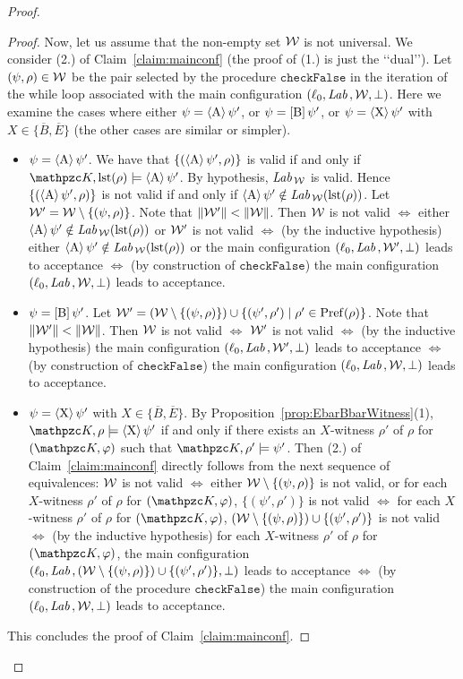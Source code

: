 \begin{proof}
\begin{proof}
Now, let us assume that the non-empty set  ${\mathcal{W}}$ is not universal.
We consider (2.) of Claim~\ref{claim:mainconf} (the proof of (1.) is just the \lq\lq dual\rq\rq).
 Let $(\psi,\rho)\in {\mathcal{W}}$ be the pair selected by the procedure $\texttt{checkFalse}$   in the iteration of the while loop   associated with the main configuration $(\ell_0,\textit{Lab}\,, {\mathcal{W}}, \operatorname{\bot})$. Here we examine the cases where either $\psi=\operatorname{\langle A\rangle}\psi'$, or $\psi=\operatorname{\mathopen[ B \mathclose]}\psi'$, or $\psi=\operatorname{\langle X\rangle}\psi'$  with $X\in \{\overline{B},\overline{E}\}$ (the other cases are similar or simpler).
\begin{itemize}
  \item $\psi=\operatorname{\langle A\rangle}\psi'$. We have that $\{(\operatorname{\langle A\rangle}\psi',\rho)\}$ is  valid if and only if $\Ku,\lst(\rho)\models \hsA\psi'$. By hypothesis, $\textit{Lab}\,_{\mathcal{W}}$ is valid.
  Hence $\{(\operatorname{\langle A\rangle}\psi',\rho)\}$ is not valid if and only if $\operatorname{\langle A\rangle}\psi'\notin \textit{Lab}\,_{\mathcal{W}}(\operatorname{lst}(\rho))$.
   Let ${\mathcal{W}}' = {\mathcal{W}}\setminus \{(\psi,\rho)\}$. Note that
      $\|{{\mathcal{W}}'}\|< \|{{\mathcal{W}}}\|$.
    Then
   ${\mathcal{W}}$ is not valid $\Longleftrightarrow$  either $\operatorname{\langle A\rangle}\psi'\notin \textit{Lab}\,_{\mathcal{W}}(\operatorname{lst}(\rho))$ or ${\mathcal{W}}'$ is not valid $\Longleftrightarrow$ (by the inductive hypothesis) either $\operatorname{\langle A\rangle}\psi'\notin \textit{Lab}\,_{\mathcal{W}}(\operatorname{lst}(\rho))$ or the main configuration $(\ell_0,\textit{Lab}\,,{\mathcal{W}}',\operatorname{\bot})$ leads to acceptance $\Longleftrightarrow$ (by construction of $\texttt{checkFalse}$) the main configuration $(\ell_0,\textit{Lab}\,,{\mathcal{W}},\operatorname{\bot})$ leads to acceptance.
  \item $\psi=\operatorname{\mathopen[ B \mathclose]}\psi'$.  Let ${\mathcal{W}}' = ({\mathcal{W}}\setminus \{(\psi,\rho)\})\cup \{(\psi',\rho')\mid \rho'\in\operatorname{Pref}(\rho)\}$. Note that
      $\|{{\mathcal{W}}'}\|< \|{{\mathcal{W}}}\|$.
Then ${\mathcal{W}}$ is not valid $\Longleftrightarrow$  ${\mathcal{W}}'$ is not valid    $\Longleftrightarrow$ (by the inductive hypothesis) the main configuration $(\ell_0,\textit{Lab}\,,{\mathcal{W}}',\operatorname{\bot})$ leads to acceptance $\Longleftrightarrow$ (by construction of $\texttt{checkFalse}$) the main configuration $(\ell_0,\textit{Lab}\,,{\mathcal{W}},\operatorname{\bot})$ leads to acceptance.
 \item $\psi=\operatorname{\langle X\rangle}\psi'$  with $X\in \{\overline{B},\overline{E}\}$. By Proposition~\ref{prop:EbarBbarWitness}(1), $\Ku,\rho\models \hsX\psi'$ if and only if there exists an $X$-witness $\rho'$ of $\rho$
  for $(\Ku,\varphi)$  such that $\Ku,\rho'\models \psi'$.     Then (2.) of Claim~\ref{claim:mainconf} directly follows from the next sequence of equivalences: ${\mathcal{W}}$ is not valid $\Longleftrightarrow$  either ${\mathcal{W}}\setminus \{(\psi,\rho)\}$ is not valid, or  for each
  $X$-witness $\rho'$ of $\rho$
  for $(\Ku,\varphi)$,  $\{(\psi',\rho')\}$ is not valid  $\Longleftrightarrow$ for each
  $X$-witness $\rho'$ of $\rho$
  for $(\Ku,\varphi)$,   $({\mathcal{W}}\setminus \{(\psi,\rho)\})\cup \{(\psi',\rho')\}$ is not valid $\Longleftrightarrow$ (by the inductive hypothesis)  for each
  $X$-witness $\rho'$ of $\rho$
  for $(\Ku,\varphi)$, the main configuration $(\ell_0,\textit{Lab}\,,({\mathcal{W}}\setminus \{(\psi,\rho)\})\cup \{(\psi',\rho')\},\operatorname{\bot})$ leads to acceptance $\Longleftrightarrow$
  (by construction of the procedure $\texttt{checkFalse}$) the main configuration  $(\ell_0,\textit{Lab}\,,{\mathcal{W}},\operatorname{\bot})$ leads to acceptance.
\end{itemize}
This concludes the proof of Claim~\ref{claim:mainconf}.
\end{proof}


\end{proof}
